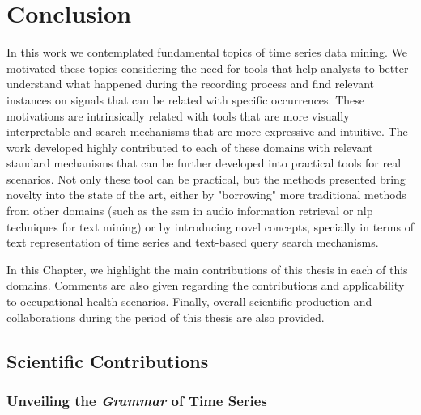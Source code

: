 
%

\chapter{Conclusion}
\label{cha:Conclusion}


In this work we contemplated fundamental topics of time series data mining. We motivated these topics considering the need for tools that help analysts to better understand what happened during the recording process and find relevant instances on signals that can be related with specific occurrences. These motivations are intrinsically related with tools that are more visually interpretable and search mechanisms that are more expressive and intuitive. The work developed highly contributed to each of these domains with relevant standard mechanisms that can be further developed into practical tools for real scenarios. Not only these tool can be practical, but the methods presented bring novelty into the state of the art, either by "borrowing" more traditional methods from other domains (such as the \gls{ssm} in audio information retrieval or \gls{nlp} techniques for text mining) or by introducing novel concepts, specially in terms of text representation of time series and text-based query search mechanisms.
\par
In this Chapter, we highlight the main contributions of this thesis in each of this domains. Comments are also given regarding the contributions and applicability to occupational health scenarios. Finally, overall scientific production and collaborations during the period of this thesis are also provided. 

\section{Scientific Contributions}

\subsection{Unveiling the \textit{Grammar} of Time Series}

